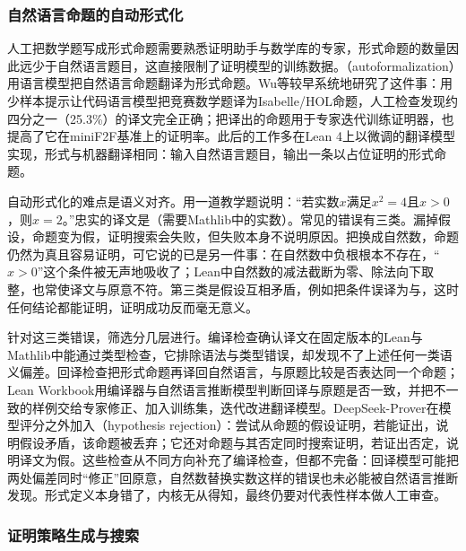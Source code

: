 \subsubsection{自然语言命题的自动形式化}
\label{sec:nlp-execution-autoformalization}

人工把数学题写成形式命题需要熟悉证明助手与数学库的专家，形式命题的数量因此远少于自然语言题目，这直接限制了证明模型的训练数据。（autoformalization）用语言模型把自然语言命题翻译为形式命题。Wu等较早系统地研究了这件事：用少样本提示让代码语言模型把竞赛数学题译为Isabelle/HOL命题，人工检查发现约四分之一（25.3\%）的译文完全正确；把译出的命题用于专家迭代训练证明器，也提高了它在miniF2F基准上的证明率。此后的工作多在Lean 4上以微调的翻译模型实现，形式与机器翻译相同：输入自然语言题目，输出一条以占位证明的形式命题。

自动形式化的难点是语义对齐。用一道教学题说明：“若实数$x$满足$x^2=4$且$x>0$，则$x=2$。”忠实的译文是（需要Mathlib中的实数）。常见的错误有三类。漏掉假设，命题变为假，证明搜索会失败，但失败本身不说明原因。把换成自然数，命题仍然为真且容易证明，可它说的已是另一件事：在自然数中负根根本不存在，“$x>0$”这个条件被无声地吸收了；Lean中自然数的减法截断为零、除法向下取整，也常使译文与原意不符。第三类是假设互相矛盾，例如把条件误译为与，这时任何结论都能证明，证明成功反而毫无意义。

针对这三类错误，筛选分几层进行。编译检查确认译文在固定版本的Lean与Mathlib中能通过类型检查，它排除语法与类型错误，却发现不了上述任何一类语义偏差。回译检查把形式命题再译回自然语言，与原题比较是否表达同一个命题；Lean Workbook用编译器与自然语言推断模型判断回译与原题是否一致，并把不一致的样例交给专家修正、加入训练集，迭代改进翻译模型。DeepSeek-Prover在模型评分之外加入（hypothesis rejection）：尝试从命题的假设证明，若能证出，说明假设矛盾，该命题被丢弃；它还对命题与其否定同时搜索证明，若证出否定，说明译文为假。这些检查从不同方向补充了编译检查，但都不完备：回译模型可能把两处偏差同时“修正”回原意，自然数替换实数这样的错误也未必能被自然语言推断发现。形式定义本身错了，内核无从得知，最终仍要对代表性样本做人工审查。

\subsubsection{证明策略生成与搜索}
\label{sec:nlp-execution-proof-search}


